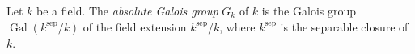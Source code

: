 \documentclass[12pt]{article}
\begin{document}
Let $k$ be a field. The {\em absolute Galois group} $G_k$ of $k$ is the Galois group $\operatorname{Gal}(k^{\operatorname{sep}}/k)$ of the field extension $k^{\operatorname{sep}}/k$, where $k^{\operatorname{sep}}$ is the separable closure of $k$.
\end{document}
